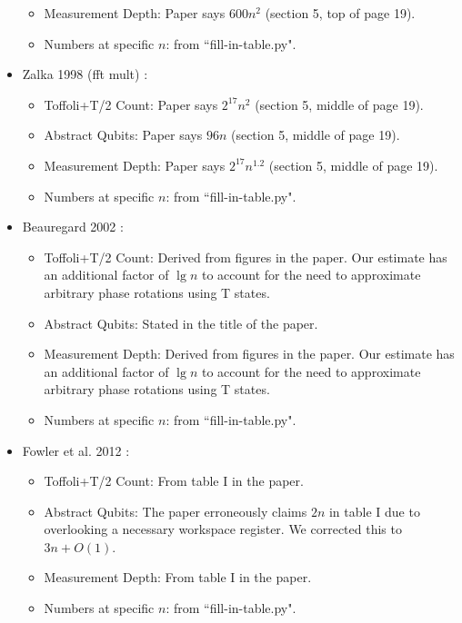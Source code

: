\documentclass[superscriptaddress,notitlepage,longbibliography]{revtex4-1}
\theoremstyle{definition}
\theoremstyle{definition}
\begin{document}
\begin{itemize}
\begin{itemize}
        \item Measurement Depth:
            Paper says $600n^2$ (section 5, top of page 19).
        \item Numbers at specific $n$: from ``fill-in-table.py".
    \end{itemize}
    \item Zalka 1998 (fft mult) \cite{zalka1998fast}:
    \begin{itemize}
        \item Toffoli+T/2 Count:
            Paper says $2^{17}n^2$ (section 5, middle of page 19).
        \item Abstract Qubits:
            Paper says $96n$ (section 5, middle of page 19).
        \item Measurement Depth:
            Paper says $2^{17}n^{1.2}$ (section 5, middle of page 19).
        \item Numbers at specific $n$: from ``fill-in-table.py".
    \end{itemize}
    \item Beauregard 2002 \cite{beauregard2002shor}:
    \begin{itemize}
        \item Toffoli+T/2 Count: Derived from figures in the paper. Our estimate has an additional factor of $\lg n$ to account for the need to approximate arbitrary phase rotations using T states.
        \item Abstract Qubits: Stated in the title of the paper.
        \item Measurement Depth: Derived from figures in the paper. Our estimate has an additional factor of $\lg n$ to account for the need to approximate arbitrary phase rotations using T states.
        \item Numbers at specific $n$: from ``fill-in-table.py".
    \end{itemize}
    \item Fowler et al. 2012 \cite{fowler2012surfacecodereview}:
    \begin{itemize}
        \item Toffoli+T/2 Count: From table I in the paper.
        \item Abstract Qubits: The paper erroneously claims $2n$ in table I due to overlooking a necessary workspace register.
        We corrected this to $3n + O(1)$.
        \item Measurement Depth: From table I in the paper.
        \item Numbers at specific $n$: from ``fill-in-table.py".

\end{itemize}
\end{itemize}
\end{document}
